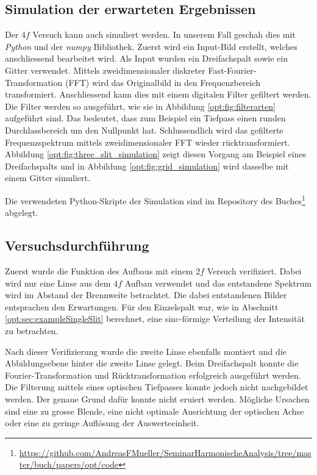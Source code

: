 \subsection{Simulation der erwarteten Ergebnissen}
Der $4f$ Versuch kann auch simuliert werden.
%
In unserem Fall geschah dies mit \emph{Python} und der \emph{numpy} Bibliothek.
%
%
Zuerst wird ein Input-Bild erstellt, welches anschliessend bearbeitet wird.
Als Input wurden ein Dreifachspalt sowie ein Gitter verwendet.
Mittels zweidimensionaler diskreter Fast-Fourier-Transformation (FFT) wird das Originalbild in den Frequenzbereich transformiert.
Anschliessend kann dies mit einem digitalen Filter gefiltert werden.
Die Filter werden so ausgeführt, wie sie in Abbildung \ref{opt:fig:filterarten} aufgeführt sind.
Das bedeutet, dass zum Beispiel ein Tiefpass einen runden Durchlassbereich um den Nullpunkt hat.
Schlussendlich wird das gefilterte Frequenzspektrum mittels zweidimensionaler FFT wieder rücktransformiert.
Abbildung \ref{opt:fig:three_slit_simulation} zeigt diesen Vorgang am Beispiel eines Dreifachspalts und 
in Abbildung \ref{opt:fig:grid_simulation} wird dasselbe mit einem Gitter simuliert.

Die verwendeten Python-Skripte der Simulation sind im Repository des Buches\footnote{\url{https://github.com/AndreasFMueller/SeminarHarmonischeAnalysis/tree/master/buch/papers/opt/code}}
abgelegt.

\subsection{Versuchsdurchführung}
Zuerst wurde die Funktion des Aufbaus mit einem $2f$ Versuch verifiziert.
Dabei wird nur eine Linse aus dem $4f$ Aufbau verwendet und das entstandene Spektrum wird im Abstand der Brennweite betrachtet.
Die dabei entstandenen Bilder entsprachen den Erwartungen.
Für den Einzelspalt war, wie in Abschnitt \ref{opt:sec:exampleSingleSlit} berechnet, eine sinc-förmige Verteilung der Intensität zu betrachten.

Nach dieser Verifizierung wurde die zweite Linse ebenfalls montiert und die Abbildungsebene hinter die zweite Linse gelegt.
Beim Dreifachspalt konnte die Fourier-Transformation und Rücktransformation erfolgreich ausgeführt werden.
Die Filterung mittels eines optischen Tiefpasses konnte jedoch nicht nachgebildet werden.
Der genaue Grund dafür konnte nicht eruiert werden.
Mögliche Ursachen sind eine zu grosse Blende, eine nicht optimale Ausrichtung der optischen Achse oder eine zu geringe Auflösung der Auswerteeinheit.

